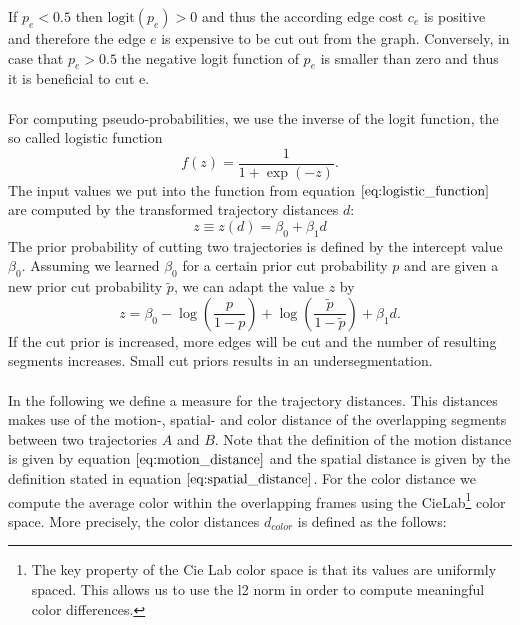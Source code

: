 If $p_e < 0.5$ then $\text{logit}\left( p_e \right) > 0$ and thus the according edge cost $c_e$ is positive and therefore the edge $e$ is expensive to be cut out from the graph. Conversely, in case that $p_e > 0.5$ the negative logit function of $p_e$ is smaller than zero and thus it is beneficial to cut e. \\ \\
For computing pseudo-probabilities, we use the inverse of the logit function, the so called logistic function
\begin{equation}
	f(z) = \frac{1}{1 + \exp \left( -z \right)}.
	\label{eq:logistic_function}
\end{equation}
The input values we put into the function from equation $\ref{eq:logistic_function}$ are computed by the transformed trajectory distances $d$:
\begin{equation}
	z \equiv z(d) = \beta_0 + \beta_1 d
\end{equation}
The prior probability of cutting two trajectories is defined by the intercept value $\beta_0$. Assuming we learned $\beta_0$ for a certain prior cut probability $p$ and are given a new prior cut probability $\tilde{p}$, we can adapt the value $z$ by
\begin{equation}
	z = \beta_0 - \log \left( \frac{p}{1-p} \right) + \log \left( \frac{\tilde{p}}{1-\tilde{p}} \right) + \beta_1 d.
\end{equation}
If the cut prior is increased, more edges will be cut and the number of resulting segments increases. Small cut priors results in an undersegmentation. \\ \\
In the following we define a measure for the trajectory distances. This distances makes use of the motion-, spatial- and color distance of the overlapping segments between two trajectories $A$ and $B$. Note that the definition of the motion distance is given by equation $\ref{eq:motion_distance}$ and the spatial distance is given by the definition stated in equation $\ref{eq:spatial_distance}$. For the color distance we compute the average color within the overlapping frames using the CieLab\footnote{The key property of the Cie Lab color space is that its values are uniformly spaced. This allows us to use the l2 norm in order to compute meaningful color differences.} color space. More precisely, the color distances $d_{color}$ is defined as the follows:

